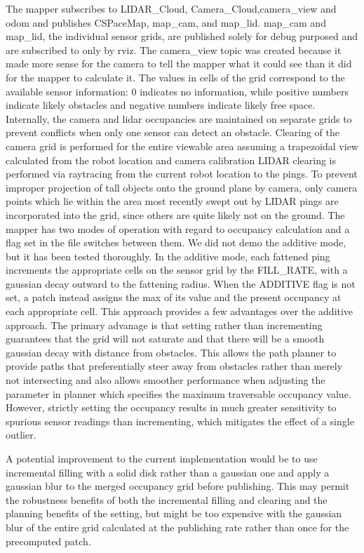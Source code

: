 \documentclass{article}
\begin{document}
The mapper subscribes to LIDAR_Cloud, Camera_Cloud,camera_view and odom and publishes CSPaceMap, map_cam, and map_lid.  
map_cam and map_lid, the individual sensor grids, are published solely for debug purposed and are subscribed to only by rviz.
The camera_view topic was created because it made more sense for the camera to tell the mapper what it could see than it did for the mapper to calculate it.
The values in cells of the grid correspond to the available sensor information: 0 indicates no information, while positive numbers indicate likely obstacles and negative numbers indicate likely free space.
Internally, the camera and lidar occupancies are maintained on separate grids to prevent conflicts when only one sensor can detect an obstacle.
Clearing of the camera grid is performed for the entire viewable area assuming a trapezoidal view calculated from the robot location and camera calibration
LIDAR clearing is performed via raytracing from the current robot location to the pings.
To prevent improper projection of tall objects onto the ground plane by camera, only camera points which lie within the area most recently swept out by LIDAR pings are incorporated into the grid, since others are quite likely not on the ground.
The mapper has two modes of operation with regard to occupancy calculation and a flag set in the file switches between them.
We did not demo the additive mode, but it has been tested thoroughly.  
In the additive mode, each fattened ping increments the appropriate cells on the sensor grid by the FILL_RATE, with a gaussian decay outward to the fattening radius.  
When the ADDITIVE flag is not set, a patch instead assigns the max of its value and the present occupancy at each appropriate cell.  
This approach provides a few advantages over the additive approach.  
The primary advanage is that setting rather than incrementing guarantees that the grid will not saturate and that there will be a smooth gaussian decay with distance from obstacles.  
This allows the path planner to provide paths that preferentially steer away from obstacles rather than merely not intersecting and also allows smoother performance when adjusting the parameter in planner which specifies the maximum traversable occupancy value.  
However, strictly setting the occupancy results in much greater sensitivity to spurious sensor readings than incrementing, which mitigates the effect of a single outlier.

A potential improvement to the current implementation would be to use incremental filling with a solid disk rather than a gaussian one and apply a gaussian blur to the merged occupancy grid before publishing.  
This may permit the robustness benefits of both the incremental filling and clearing and the planning benefits of the setting, but might be too expensive with the gaussian blur of the entire grid calculated at the publishing rate rather than once for the precomputed patch.
\end{document}

